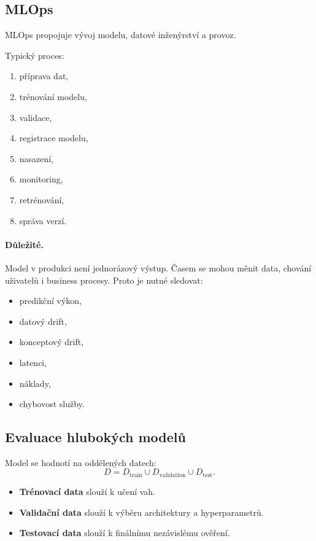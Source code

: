 \subsection{MLOps}

MLOps propojuje vývoj modelu, datové inženýrství a provoz.

Typický proces:
\begin{enumerate}
    \item příprava dat,
    \item trénování modelu,
    \item validace,
    \item registrace modelu,
    \item nasazení,
    \item monitoring,
    \item retrénování,
    \item správa verzí.
\end{enumerate}

\paragraph{Důležité.}
Model v produkci není jednorázový výstup. Časem se mohou měnit data, chování uživatelů i business procesy.
Proto je nutné sledovat:
\begin{itemize}
    \item predikční výkon,
    \item datový drift,
    \item konceptový drift,
    \item latenci,
    \item náklady,
    \item chybovost služby.
\end{itemize}

\subsection{Evaluace hlubokých modelů}

Model se hodnotí na oddělených datech:
\[
D =
D_{\text{train}}
\cup
D_{\text{validation}}
\cup
D_{\text{test}}.
\]

\begin{itemize}
    \item \textbf{Trénovací data} slouží k učení vah.
    \item \textbf{Validační data} slouží k výběru architektury a hyperparametrů.
    \item \textbf{Testovací data} slouží k finálnímu nezávislému ověření.
\end{itemize}

